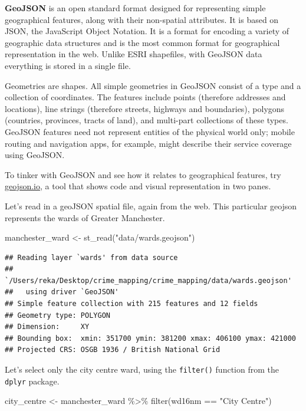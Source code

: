 \documentclass[
  krantz2]{krantz}
\makeatletter
\newenvironment{Shaded}{\begin{snugshade}}{\end{snugshade}}
\newcommand{\FunctionTok}[1]{\textcolor[rgb]{0,0,0}{#1}}
\newcommand{\NormalTok}[1]{#1}
\newcommand{\OtherTok}[1]{\textcolor[rgb]{0.37,0.37,0.37}{#1}}
\newcommand{\SpecialCharTok}[1]{\textcolor[rgb]{0,0,0}{#1}}
\newcommand{\StringTok}[1]{\textcolor[rgb]{0.5,0.5,0.5}{#1}}
\newenvironment{kframe}{%
\medskip{}
\setlength{\fboxsep}{.8em}
 \def\at@end@of@kframe{}%
 \ifinner\ifhmode%
  \def\at@end@of@kframe{\end{minipage}}%
  \begin{minipage}{\columnwidth}%
 \fi\fi%
 \def\FrameCommand##1{\hskip\@totalleftmargin \hskip-\fboxsep
 \colorbox{shadecolor}{##1}\hskip-\fboxsep
     \hskip-\linewidth \hskip-\@totalleftmargin \hskip\columnwidth}%
 \MakeFramed {\advance\hsize-\width
   \@totalleftmargin\z@ \linewidth\hsize
   \@setminipage}}%
 {\par\unskip\endMakeFramed%
 \at@end@of@kframe}
\renewenvironment{Shaded}{\begin{kframe}}{\end{kframe}}
\makeatother
\begin{document}
\textbf{GeoJSON} is an open standard format designed for representing simple geographical features, along with their non-spatial attributes. It is based on JSON, the JavaScript Object Notation. It is a format for encoding a variety of geographic data structures and is the most common format for geographical representation in the web. Unlike ESRI shapefiles, with GeoJSON data everything is stored in a single file.

Geometries are shapes. All simple geometries in GeoJSON consist of a type and a collection of coordinates. The features include points (therefore addresses and locations), line strings (therefore streets, highways and boundaries), polygons (countries, provinces, tracts of land), and multi-part collections of these types. GeoJSON features need not represent entities of the physical world only; mobile routing and navigation apps, for example, might describe their service coverage using GeoJSON.

To tinker with GeoJSON and see how it relates to geographical features, try \url{geojson.io}, a tool that shows code and visual representation in two panes.

Let's read in a geoJSON spatial file, again from the web. This particular geojson represents the wards of Greater Manchester.

\begin{Shaded}
\begin{Highlighting}[]
\NormalTok{manchester\_ward }\OtherTok{\textless{}{-}} \FunctionTok{st\_read}\NormalTok{(}\StringTok{"data/wards.geojson"}\NormalTok{)}
\end{Highlighting}
\end{Shaded}

\begin{verbatim}
## Reading layer `wards' from data source 
##   `/Users/reka/Desktop/crime_mapping/crime_mapping/data/wards.geojson' 
##   using driver `GeoJSON'
## Simple feature collection with 215 features and 12 fields
## Geometry type: POLYGON
## Dimension:     XY
## Bounding box:  xmin: 351700 ymin: 381200 xmax: 406100 ymax: 421000
## Projected CRS: OSGB 1936 / British National Grid
\end{verbatim}

Let's select only the city centre ward, using the \texttt{filter()} function from the \texttt{dplyr} package.

\begin{Shaded}
\begin{Highlighting}[]
\NormalTok{city\_centre }\OtherTok{\textless{}{-}}\NormalTok{ manchester\_ward }\SpecialCharTok{\%\textgreater{}\%}
  \FunctionTok{filter}\NormalTok{(wd16nm }\SpecialCharTok{==} \StringTok{"City Centre"}\NormalTok{)}
\end{Highlighting}
\end{Shaded}
\end{document}
